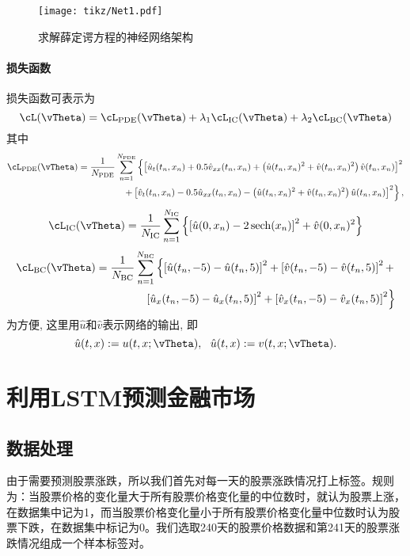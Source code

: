 \documentclass[addpoints,answers]{exam}
\DeclareMathOperator{\sech}{sech}
\begin{document}
  \begin{figure}[htbp]
    \centering
    \texttt{[image: tikz/Net1.pdf]}
    \caption{求解薛定谔方程的神经网络架构}
  \end{figure}

 \paragraph{损失函数} 损失函数可表示为
    $$
    \cL(\vTheta) = \cL_{\mathrm{PDE}}(\vTheta) + \lambda_1 \cL_{\mathrm{IC}}(\vTheta) + \lambda_2 \cL_{\mathrm{BC}}(\vTheta)
    $$
    其中
    $$
    \begin{aligned}
      \cL_{\mathrm{PDE}}(\vTheta) = \frac1{N_{\mathrm{PDE}}} \sum_{n=1}^{N_{\mathrm{PDE}}} \left\{  \left[\hat u_t (t_n, x_n) + 0.5 \hat v_{xx}(t_n, x_n) + \left(\hat u(t_n, x_n)^2+\hat v(t_n, x_n)^2\right)\hat v(t_n, x_n) \right]^2 \right. \\
      \quad \left. + \left[\hat v_t(t_n, x_n) - 0.5 \hat u_{xx}(t_n, x_n) - \left(\hat u(t_n, x_n)^2+\hat v(t_n, x_n)^2\right)\hat u(t_n, x_n)\right]^2 \right\},
    \end{aligned}
    $$
    $$
    \begin{aligned}
      \cL_{\mathrm{IC}}(\vTheta) = \frac1{N_{\mathrm{IC}}} \sum_{n=1}^{N_{\mathrm{IC}}} \left\{\left[\hat u(0,x_n) - 2 \sech (x_n)\right]^2 + \hat v(0, x_n)^2 \right\}
    \end{aligned}
    $$
    $$
    \begin{aligned}
      \cL_{\mathrm{BC}}(\vTheta) = \frac1{N_{\mathrm{BC}}} \sum_{n=1}^{N_{\mathrm{BC}}} \left\{
      \left[\hat u(t_n,-5) - \hat u(t_n, 5)\right]^2 + 
      \left[\hat v(t_n,-5) - \hat v(t_n, 5)\right]^2 + \right. \\
      \quad \left. \left[\hat u_x(t_n,-5) - \hat u_x(t_n, 5)\right]^2 +
      \left[\hat v_x(t_n,-5) - \hat v_x(t_n, 5)\right]^2 
      \right\}
    \end{aligned}
    $$
    为方便, 这里用$\hat u$和$\hat v$表示网络的输出, 即
    $$
    \hat u(t, x) := u(t, x; \vTheta), ~~
    \hat u(t, x) := v(t, x; \vTheta).
    $$


  

  

 
\section{利用LSTM预测金融市场}
\subsection{数据处理}
由于需要预测股票涨跌，所以我们首先对每一天的股票涨跌情况打上标签。规则为：当股票价格的变化量大于所有股票价格变化量的中位数时，就认为股票上涨，在数据集中记为1，而当股票价格变化量小于所有股票价格变化量中位数时认为股票下跌，在数据集中标记为0。我们选取240天的股票价格数据和第241天的股票涨跌情况组成一个样本标签对。
\end{document}
